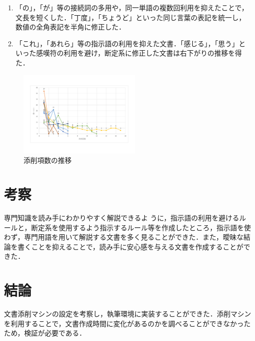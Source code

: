 \documentclass[uplatex,twocolumn,dvipdfmx]{jsarticle}
\begin{document}
\begin{enumerate}
\item 「の」，「が」等の接続詞の多用や，同一単語の複数回利用を抑えたことで，文長を短くした．「丁度」，「ちょうど」といった同じ言葉の表記を統一し，数値の全角表記を半角に修正した． 
\item 「これ」，「あれら」等の指示語の利用を抑えた文書．「感じる」，「思う」といった感嘆符の利用を避け，断定系に修正した文書は右下がりの推移を得た．
\end{enumerate}

\begin{figure}[htb]
\centering
\includegraphics[width=6cm,clip]{redpen.pdf}
\caption{添削項数の推移}\label{conf}
\end{figure}

\section{考察}
専門知識を読み手にわかりやすく解説できるよ うに，指示語の利用を避けるルールと，断定系を使用するよう指示するルール等を作成したところ，指示語を使わず，専門用語を用いて解説する文書を多く見ることができた．また，曖昧な結論を書くことを抑えることで，読み手に安心感を与える文書を作成することができた．

\section{結論}
文書添削マシンの設定を考察し，執筆環境に実装することができた．添削マシンを利用することで，文書作成時間に変化があるのかを調べることができなかったため，検証が必要である．






\end{document}
